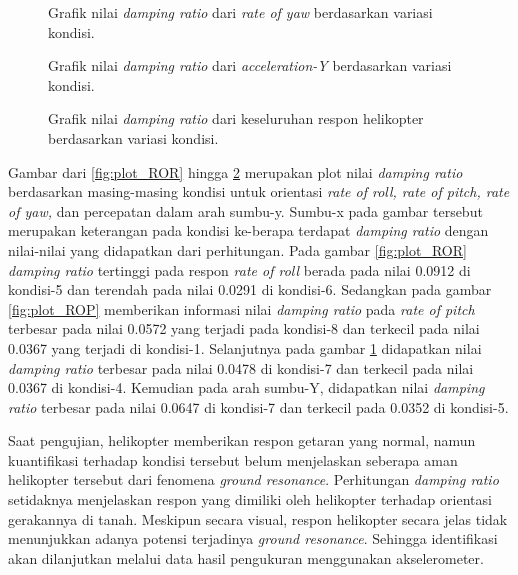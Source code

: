 \begin{figure}[h]
	\centering
	\caption{Grafik nilai \textit{damping ratio} dari \textit{rate of yaw} berdasarkan variasi kondisi.}
	\label{fig:plot_ROY}
\end{figure}

\begin{figure}[h]
	\centering
	\caption{Grafik nilai \textit{damping ratio} dari \textit{acceleration-Y} berdasarkan variasi kondisi.}
	\label{fig:plot_Acc_Y}
\end{figure}

\begin{figure}[H]
	\centering
	\caption{Grafik nilai \textit{damping ratio} dari keseluruhan respon helikopter berdasarkan variasi kondisi.}
	\label{fig:plot_All}
\end{figure}

Gambar dari \ref{fig:plot_ROR} hingga \ref{fig:plot_Acc_Y} merupakan plot nilai \textit{damping ratio} berdasarkan masing-masing kondisi untuk orientasi \textit{rate of roll, rate of pitch, rate of yaw,} dan percepatan dalam arah sumbu-y. Sumbu-x pada gambar tersebut merupakan keterangan pada kondisi ke-berapa terdapat \textit{damping ratio} dengan nilai-nilai yang didapatkan dari perhitungan. Pada gambar \ref{fig:plot_ROR} \textit{damping ratio} tertinggi pada respon \textit{rate of roll} berada pada nilai 0.0912 di kondisi-5 dan terendah pada nilai 0.0291 di kondisi-6. Sedangkan pada gambar \ref{fig:plot_ROP} memberikan informasi nilai \textit{damping ratio} pada \textit{rate of pitch} terbesar pada nilai 0.0572 yang terjadi pada kondisi-8 dan terkecil pada nilai 0.0367 yang terjadi di kondisi-1. Selanjutnya pada gambar \ref{fig:plot_ROY} didapatkan nilai \textit{damping ratio} terbesar pada nilai 0.0478 di kondisi-7 dan terkecil pada nilai 0.0367 di kondisi-4. Kemudian pada arah sumbu-Y, didapatkan nilai \textit{damping ratio} terbesar pada nilai 0.0647 di kondisi-7 dan terkecil pada 0.0352 di kondisi-5.  

Saat pengujian, helikopter memberikan respon getaran yang normal, namun kuantifikasi terhadap kondisi tersebut belum menjelaskan seberapa aman helikopter tersebut dari fenomena \textit{ground resonance}. Perhitungan \textit{damping ratio} setidaknya menjelaskan respon yang dimiliki oleh helikopter terhadap orientasi gerakannya di tanah. Meskipun secara visual, respon helikopter secara jelas tidak menunjukkan adanya potensi terjadinya \textit{ground resonance}. Sehingga identifikasi akan dilanjutkan melalui data hasil pengukuran menggunakan akselerometer.

